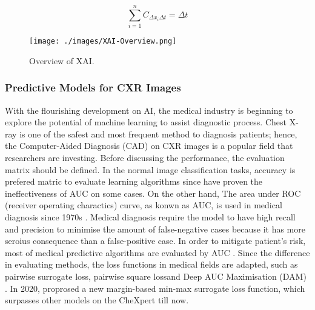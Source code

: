 \begin{equation} \label{eq: summation-to-delta}
    \sum_{i=1}^{n} C_{\Delta x_{i} \Delta t} = \Delta t
\end{equation}

\begin{figure}[!h]
    \centering
    \texttt{[image: ./images/XAI-Overview.png]}
    \caption{Overview of XAI. \citet{Belle2020XAIPriciples}}
    \label{fig: XAI_Overview}
\end{figure}

\subsubsection{Predictive Models for CXR Images}

With the flourishing development on AI, the medical industry is beginning to explore the potential of machine learning to assist diagnostic  process. Chest X-ray is one of the safest and most frequent method to diagnosis patients; hence, the Computer-Aided Diagnosis (CAD) on CXR images is a popular field that researchers are investing. Before discussing the performance, the evaluation matrix should be defined. In the normal image classification tasks, accuracy is prefered matric to evaluate learning algorithms since \citep{Lobo2008AUDIsWrong} have proven the ineffectiveness of AUC on some cases. On the other hand, The area under ROC (receiver operating charactics) curve, as konwn as AUC, is used in medical diagnosis since 1970s \citep{Huang2005AUC}. Medical diagnosis require the model to have high recall and precision to minimise the amount of false-negative cases because it has more seroius consequence than a false-positive case. In order to mitigate patient's risk, most of medical predictive algorithms are evaluated by AUC \citep{HajianTilaki2013AUDOnMedical}. Since the difference in evaluating methods, the loss functions in medical fields are adapted, such as pairwise surrogate loss\citep{Gao2012SSurrogatelossAUC}, pairwise square loss\citep{Gao2013AUCSquareLoss}and Deep AUC Maximisation (DAM) \citep{Sulam2017MaximizingAUD}. In 2020, \citet{Yuan2020DAM} proprosed a new margin-based min-max surrogate loss function, which surpasses other models on the CheXpert\citep{Irvin2019Chexpert} till now. \\

